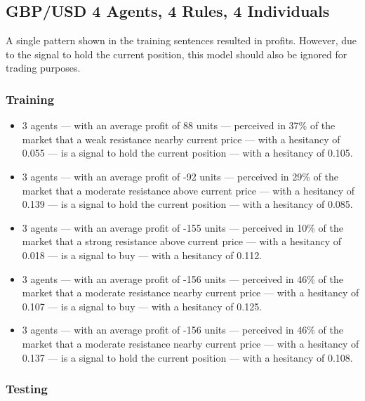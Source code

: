 \subsection{GBP/USD 4 Agents, 4 Rules, 4 Individuals}
\label{}

A single pattern shown in the training sentences resulted in profits. However,
due to the signal to hold the current position, this model should also be
ignored for trading purposes.

\subsubsection{Training}
\label{}

{\small
  \begin{itemize}
  \item 3 agents — with an average profit of 88 units — perceived in 37\% of the
    market that a weak resistance nearby current price — with a hesitancy of
    0.055 — is a signal to hold the current position — with a hesitancy of
    0.105.
  \item 3 agents — with an average profit of -92 units — perceived in 29\% of
    the market that a moderate resistance above current price — with a hesitancy
    of 0.139 — is a signal to hold the current position — with a hesitancy of
    0.085.
  \item 3 agents — with an average profit of -155 units — perceived in 10\% of
    the market that a strong resistance above current price — with a hesitancy
    of 0.018 — is a signal to buy — with a hesitancy of 0.112.
  \item 3 agents — with an average profit of -156 units — perceived in 46\% of
    the market that a moderate resistance nearby current price — with a
    hesitancy of 0.107 — is a signal to buy — with a hesitancy of 0.125.
  \item 3 agents — with an average profit of -156 units — perceived in 46\% of
    the market that a moderate resistance nearby current price — with a
    hesitancy of 0.137 — is a signal to hold the current position — with a
    hesitancy of 0.108.
  \end{itemize}
}

\subsubsection{Testing}
\label{}

